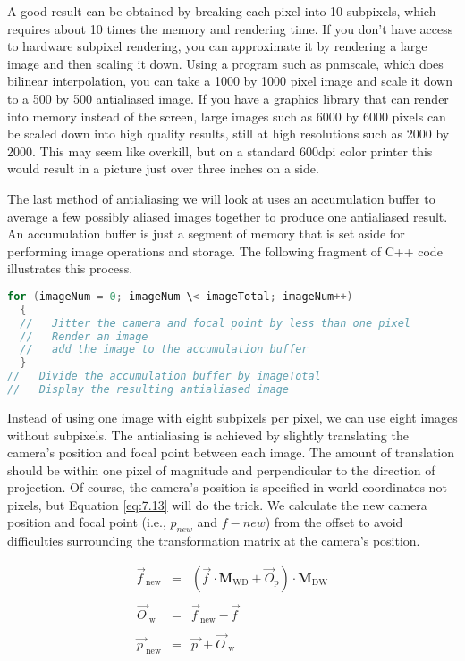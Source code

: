 A good result can be obtained by breaking each pixel into 10 subpixels, which requires about 10 times the memory and rendering time. If you don't have access to hardware subpixel rendering, you can approximate it by rendering a large image and then scaling it down. Using a program such as pnmscale, which does bilinear interpolation, you can take a 1000 by 1000 pixel image and scale it down to a 500 by 500 antialiased image. If you have a graphics library that can render into memory instead of the screen, large images such as 6000 by 6000 pixels can be scaled down into high quality results, still at high resolutions such as 2000 by 2000. This may seem like overkill, but on a standard 600dpi color printer this would result in a picture just over three inches on a side.

The last method of antialiasing we will look at uses an accumulation buffer to average a few possibly aliased images together to produce one antialiased result. An accumulation buffer is just a segment of memory that is set aside for performing image operations and storage. The following fragment of C++ code illustrates this process.

\begin{lstlisting}[language=C++, caption={Using an accumulation buffer.}]
for (imageNum = 0; imageNum \< imageTotal; imageNum++)
  {
  //   Jitter the camera and focal point by less than one pixel
  //   Render an image
  //   add the image to the accumulation buffer
  }
//   Divide the accumulation buffer by imageTotal
//   Display the resulting antialiased image
\end{lstlisting}

Instead of using one image with eight subpixels per pixel, we can use eight images without subpixels. The antialiasing is achieved by slightly translating the camera's position and focal point between each image. The amount of translation should be within one pixel of magnitude and perpendicular to the direction of projection. Of course, the camera's position is specified in world coordinates not pixels, but Equation \ref{eq:7.13} will do the trick. We calculate the new camera position and focal point (i.e., $p_{new}$ and $f-{new}$) from the offset to avoid difficulties surrounding the transformation matrix at the camera's position.

\begin{equation}\label{eq:7.13}
\begin{array}{lll}
\overrightarrow{f\ }_\text{new} &=& \left(\overrightarrow{f\ }\cdot \textbf{M}_\text{WD} + \overrightarrow{O}_\text{p}\right)\cdot \textbf{M}_\text{DW} \\ \\
\overrightarrow{O\ }_\text{w} &=& \overrightarrow{f\ }_\text{new} - \overrightarrow{f\ } \\ \\
\overrightarrow{p\ }_\text{new} &=& \overrightarrow{p\ } + \overrightarrow{O\ }_\text{w}
\end{array}
\end{equation}

